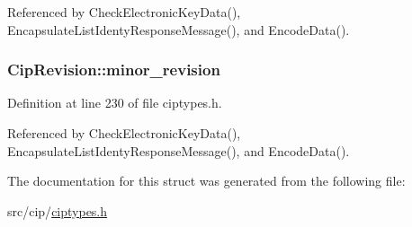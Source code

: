 \-Referenced by \-Check\-Electronic\-Key\-Data(), \-Encapsulate\-List\-Identy\-Response\-Message(), and \-Encode\-Data().

\hypertarget{structCipRevision_a5be82fd0db42cdb2c1d91127173b075f}{
\subsubsection[{minor\-\_\-revision}]{ {\bf \-Cip\-Revision\-::minor\-\_\-revision}}}\label{d0/d46/structCipRevision_a5be82fd0db42cdb2c1d91127173b075f}


\-Definition at line 230 of file ciptypes.\-h.



\-Referenced by \-Check\-Electronic\-Key\-Data(), \-Encapsulate\-List\-Identy\-Response\-Message(), and \-Encode\-Data().



\-The documentation for this struct was generated from the following file\-:\begin{DoxyCompactItemize}
\item 
src/cip/\hyperlink{ciptypes_8h}{ciptypes.\-h}\end{DoxyCompactItemize}
